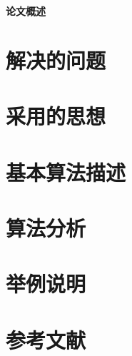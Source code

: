 \documentclass{ML}
\begin{document}
\maketitle

\tableofcontents
\newpage

\begin{center}
    \textbf{ 论文概述}
\end{center}

\section{解决的问题}

\section{采用的思想}

\section{基本算法描述}

\section{算法分析}

\section{举例说明}


\section{参考文献}
\begin{thebibliography}{20}
\end{thebibliography}
\end{document}
